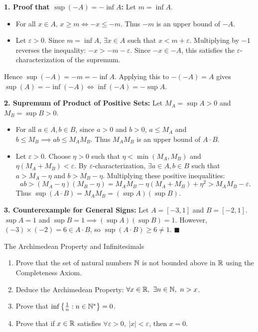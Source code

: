 \begin{solution}
\textbf{1. Proof that $\sup(-A) = -\inf A$:}
Let $m = \inf A$.
\begin{itemize}[leftmargin=1.5em,itemsep=1pt]
  \item For all $x \in A$, $x \ge m \iff -x \le -m$.
  Thus $-m$ is an upper bound of $-A$.
  \item Let $\varepsilon > 0$. Since $m = \inf A$, $\exists x \in A$ such that $x < m + \varepsilon$.
  Multiplying by $-1$ reverses the inequality: $-x > -m - \varepsilon$.
  Since $-x \in -A$, this satisfies the $\varepsilon$-characterization of the supremum.
\end{itemize}
Hence $\sup(-A) = -m = -\inf A$.
Applying this to $-(-A) = A$ gives $\sup(A) = -\inf(-A) \iff \inf(-A) = -\sup A$.

\textbf{2. Supremum of Product of Positive Sets:}
Let $M_A = \sup A > 0$ and $M_B = \sup B > 0$.
\begin{itemize}[leftmargin=1.5em,itemsep=2pt]
  \item For all $a \in A, b \in B$, since $a > 0$ and $b > 0$, $a \le M_A$ and $b \le M_B \implies ab \le M_A M_B$.
  Thus $M_A M_B$ is an upper bound of $A \cdot B$.
  \item Let $\varepsilon > 0$. Choose $\eta > 0$ such that $\eta < \min(M_A, M_B)$ and $\eta(M_A + M_B) < \varepsilon$.
  By $\varepsilon$-characterization, $\exists a \in A, b \in B$ such that $a > M_A - \eta$ and $b > M_B - \eta$.
  Multiplying these positive inequalities:
  \[
  ab > (M_A - \eta)(M_B - \eta) = M_A M_B - \eta(M_A + M_B) + \eta^2 > M_A M_B - \varepsilon.
  \]
  Thus $\sup(A \cdot B) = M_A M_B = (\sup A)(\sup B)$.
\end{itemize}

\textbf{3. Counterexample for General Signs:}
Let $A = [-3, 1]$ and $B = [-2, 1]$.
$\sup A = 1$ and $\sup B = 1 \implies (\sup A)(\sup B) = 1$.
However, $(-3) \times (-2) = 6 \in A \cdot B$, so $\sup(A \cdot B) \ge 6 \ne 1$. \hfill $\blacksquare$
\end{solution}

\begin{exercise}{The Archimedean Property and Infinitesimals}
\begin{enumerate}[leftmargin=1.5em,itemsep=2pt]
  \item Prove that the set of natural numbers $\mathbb{N}$ is not bounded above in $\mathbb{R}$ using the Completeness Axiom.
  \item Deduce the Archimedean Property: $\forall x \in \mathbb{R},\ \exists n \in \mathbb{N},\ n > x$.
  \item Prove that $\inf \left\{ \frac{1}{n} : n \in \mathbb{N}^* \right\} = 0$.
  \item Prove that if $x \in \mathbb{R}$ satisfies $\forall \varepsilon > 0,\ |x| < \varepsilon$, then $x = 0$.
\end{enumerate}
\end{exercise}

